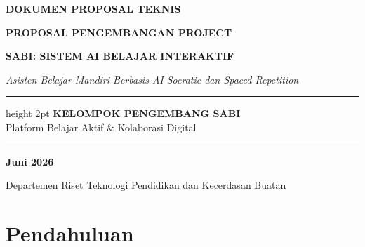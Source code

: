 \documentclass[12pt,a4paper]{article}
\begin{document}

\begin{titlepage}
    \centering
    \vspace*{2cm}
    
    {\large\bfseries\color{secondary} DOKUMEN PROPOSAL TEKNIS \par}
    \vspace{1.5cm}
    
    {\Huge\bfseries\color{primary} PROPOSAL PENGEMBANGAN PROJECT \par}
    \vspace{0.8cm}
    {\Large\bfseries\color{dark} SABI: SISTEM AI BELAJAR INTERAKTIF \par}
    \vspace{0.4cm}
    {\large\itshape Asisten Belajar Mandiri Berbasis AI Socratic dan Spaced Repetition \par}
    
    \vspace{3cm}
    
    \begin{minipage}{0.6\textwidth}
        \centering
        \hrule height 2pt
        \vspace{0.4cm}
        {\bfseries\color{primary} KELOMPOK PENGEMBANG SABI} \\
        \small Platform Belajar Aktif \& Kolaborasi Digital \\
        \vspace{0.4cm}
        \hrule
    \end{minipage}
    
    \vfill
    
    {\large\bfseries Juni 2026 \par}
    {\small Departemen Riset Teknologi Pendidikan dan Kecerdasan Buatan \par}
    
\end{titlepage}

\newpage
{}
\tableofcontents
\newpage
{}

\section{Pendahuluan}
\end{document}

